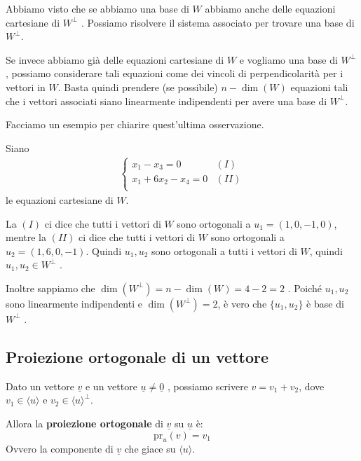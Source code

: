 \documentclass[
  a4paper,
]{article}
\begin{document}
\begin{observationbox}
Abbiamo visto che se abbiamo una base di \(W\) abbiamo anche delle
equazioni cartesiane di \(W^{\perp}\) . Possiamo risolvere il sistema
associato per trovare una base di \(W^{\perp}\).
\end{observationbox}

\begin{observationbox}
Se invece abbiamo già delle equazioni cartesiane di \(W\) e vogliamo una
base di \(W^{\perp}\), possiamo considerare tali equazioni come dei
vincoli di perpendicolarità per i vettori in \(W\). Basta quindi
prendere (se possibile) \(n - \dim(W)\) equazioni tali che i vettori
associati siano linearmente indipendenti per avere una base di
\(W^{\perp}\).
\end{observationbox}

\begin{examplebox}
Facciamo un esempio per chiarire quest'ultima osservazione.

Siano \[
\begin{aligned}
\begin{cases}
x_1  - x_3 = 0 &(I)\\
x_1 + 6x_2 - x_4 = 0 &(II) \\
\end{cases}
\end{aligned}
\] le equazioni cartesiane di \(W\).

La \((I)\) ci dice che tutti i vettori di \(W\) sono ortogonali a
\(u_1 = (1, 0, -1, 0)\), mentre la \((II)\) ci dice che tutti i vettori
di \(W\) sono ortogonali a \(u_2 = (1, 6, 0, -1)\). Quindi \(u_1, u_2\)
sono ortogonali a tutti i vettori di \(W\), quindi
\(u_1, u_2 \in W^{\perp}\) .

Inoltre sappiamo che \(\dim(W^{\perp}) = n - \dim(W) = 4 -2 = 2\) .
Poiché \(u_1, u_2\) sono linearmente indipendenti e
\(\dim(W^{\perp}) = 2\), è vero che \(\{u_1, u_2\}\) è base di
\(W^{\perp}\) .
\end{examplebox}

\hypertarget{proiezione-ortogonale-di-un-vettore}{%
\subsection{Proiezione ortogonale di un
vettore}\label{proiezione-ortogonale-di-un-vettore}}

\begin{definitionbox}
Dato un vettore \(\underline{v}\) e un vettore
\(\underline{u} \neq \underline{0}\) , possiamo scrivere
\(v = v_1 + v_2\), dove \(v_1 \in \langle u \rangle\) e
\(v_2 \in \langle u \rangle^{\perp}\).

Allora la \textbf{proiezione ortogonale} di \(\underline{v}\) su
\(\underline{u}\) è: \[
\text{pr}_u(v) = v_1
\] Ovvero la componente di \(\underline{v}\) che giace su
\(\langle u \rangle\).
\end{definitionbox}
\end{document}
